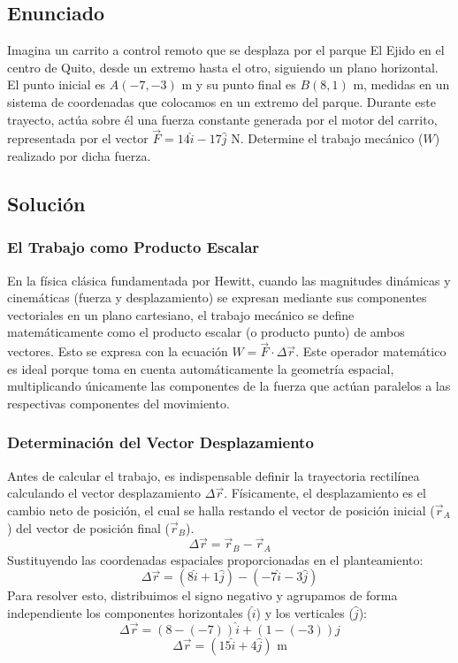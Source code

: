 \documentclass[a4paper,12pt]{article}
\begin{document}
\newpage

\subsection*{Enunciado}
Imagina un carrito a control remoto que se desplaza por el parque El Ejido en el centro de Quito, desde un extremo hasta el otro, siguiendo un plano horizontal. El punto inicial es $A(-7,-3)\text{ m}$ y su punto final es $B(8,1)\text{ m}$, medidas en un sistema de coordenadas que colocamos en un extremo del parque. Durante este trayecto, actúa sobre él una fuerza constante generada por el motor del carrito, representada por el vector $\vec{F} = 14\hat{i} - 17\hat{j}\text{ N}$. Determine el trabajo mecánico ($W$) realizado por dicha fuerza.

\subsection*{Solución}

\subsubsection*{El Trabajo como Producto Escalar}
En la física clásica fundamentada por Hewitt, cuando las magnitudes dinámicas y cinemáticas (fuerza y desplazamiento) se expresan mediante sus componentes vectoriales en un plano cartesiano, el trabajo mecánico se define matemáticamente como el producto escalar (o producto punto) de ambos vectores. Esto se expresa con la ecuación $W = \vec{F} \cdot \Delta\vec{r}$. Este operador matemático es ideal porque toma en cuenta automáticamente la geometría espacial, multiplicando únicamente las componentes de la fuerza que actúan paralelos a las respectivas componentes del movimiento.

\subsubsection*{Determinación del Vector Desplazamiento}
Antes de calcular el trabajo, es indispensable definir la trayectoria rectilínea calculando el vector desplazamiento $\Delta\vec{r}$. Físicamente, el desplazamiento es el cambio neto de posición, el cual se halla restando el vector de posición inicial ($\vec{r}_A$) del vector de posición final ($\vec{r}_B$).
$$\Delta\vec{r} = \vec{r}_B - \vec{r}_A$$
Sustituyendo las coordenadas espaciales proporcionadas en el planteamiento:
$$\Delta\vec{r} = (8\hat{i} + 1\hat{j}) - (-7\hat{i} - 3\hat{j})$$
Para resolver esto, distribuimos el signo negativo y agrupamos de forma independiente los componentes horizontales ($\hat{i}$) y los verticales ($\hat{j}$):
$$\Delta\vec{r} = (8 - (-7))\hat{i} + (1 - (-3))\hat{j}$$
$$\Delta\vec{r} = (15\hat{i} + 4\hat{j})\text{ m}$$
\end{document}

